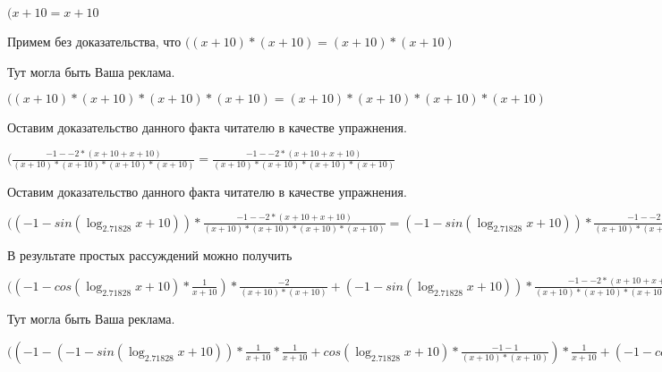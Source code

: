 \documentclass[12pt,a4paper,fleqn]{article}
\theoremstyle{definition}
\begin{document}
$( x  +  10  =  x  +  10 $

Примем без доказательства, что
$(( x  +  10 ) * ( x  +  10 ) = ( x  +  10 ) * ( x  +  10 )$

Тут могла быть Ваша реклама.

$(( x  +  10 ) * ( x  +  10 ) * ( x  +  10 ) * ( x  +  10 ) = ( x  +  10 ) * ( x  +  10 ) * ( x  +  10 ) * ( x  +  10 )$

Оставим доказательство данного факта читателю в качестве упражнения.

$(\frac{ -1  -  -2  * ( x  +  10  +  x  +  10 )}{( x  +  10 ) * ( x  +  10 ) * ( x  +  10 ) * ( x  +  10 )}
 = \frac{ -1  -  -2  * ( x  +  10  +  x  +  10 )}{( x  +  10 ) * ( x  +  10 ) * ( x  +  10 ) * ( x  +  10 )}
$

Оставим доказательство данного факта читателю в качестве упражнения.

$(( -1  - sin(\log_{ 2.71828 }{ x  +  10 })) * \frac{ -1  -  -2  * ( x  +  10  +  x  +  10 )}{( x  +  10 ) * ( x  +  10 ) * ( x  +  10 ) * ( x  +  10 )}
 = ( -1  - sin(\log_{ 2.71828 }{ x  +  10 })) * \frac{ -1  -  -2  * ( x  +  10  +  x  +  10 )}{( x  +  10 ) * ( x  +  10 ) * ( x  +  10 ) * ( x  +  10 )}
$

В результате простых рассуждений можно получить

$(( -1  - cos(\log_{ 2.71828 }{ x  +  10 }) * \frac{ 1 }{ x  +  10 }
) * \frac{ -2 }{( x  +  10 ) * ( x  +  10 )}
 + ( -1  - sin(\log_{ 2.71828 }{ x  +  10 })) * \frac{ -1  -  -2  * ( x  +  10  +  x  +  10 )}{( x  +  10 ) * ( x  +  10 ) * ( x  +  10 ) * ( x  +  10 )}
 = ( -1  - cos(\log_{ 2.71828 }{ x  +  10 }) * \frac{ 1 }{ x  +  10 }
) * \frac{ -2 }{( x  +  10 ) * ( x  +  10 )}
 + ( -1  - sin(\log_{ 2.71828 }{ x  +  10 })) * \frac{ -1  -  -2  * ( x  +  10  +  x  +  10 )}{( x  +  10 ) * ( x  +  10 ) * ( x  +  10 ) * ( x  +  10 )}
$

Тут могла быть Ваша реклама.

$(( -1  - ( -1  - sin(\log_{ 2.71828 }{ x  +  10 })) * \frac{ 1 }{ x  +  10 }
 * \frac{ 1 }{ x  +  10 }
 + cos(\log_{ 2.71828 }{ x  +  10 }) * \frac{ -1  -  1 }{( x  +  10 ) * ( x  +  10 )}
) * \frac{ 1 }{ x  +  10 }
 + ( -1  - cos(\log_{ 2.71828 }{ x  +  10 }) * \frac{ 1 }{ x  +  10 }
) * \frac{ -1  -  1 }{( x  +  10 ) * ( x  +  10 )}
 + ( -1  - cos(\log_{ 2.71828 }{ x  +  10 }) * \frac{ 1 }{ x  +  10 }
) * \frac{ -2 }{( x  +  10 ) * ( x  +  10 )}
 + ( -1  - sin(\log_{ 2.71828 }{ x  +  10 })) * \frac{ -1  -  -2  * ( x  +  10  +  x  +  10 )}{( x  +  10 ) * ( x  +  10 ) * ( x  +  10 ) * ( x  +  10 )}
 = ( -1  - ( -1  - sin(\log_{ 2.71828 }{ x  +  10 })) * \frac{ 1 }{ x  +  10 }
 * \frac{ 1 }{ x  +  10 }
 + cos(\log_{ 2.71828 }{ x  +  10 }) * \frac{ -1  -  1 }{( x  +  10 ) * ( x  +  10 )}
) * \frac{ 1 }{ x  +  10 }
 + ( -1  - cos(\log_{ 2.71828 }{ x  +  10 }) * \frac{ 1 }{ x  +  10 }
) * \frac{ -1  -  1 }{( x  +  10 ) * ( x  +  10 )}
 + ( -1  - cos(\log_{ 2.71828 }{ x  +  10 }) * \frac{ 1 }{ x  +  10 }
) * \frac{ -2 }{( x  +  10 ) * ( x  +  10 )}
 + ( -1  - sin(\log_{ 2.71828 }{ x  +  10 })) * \frac{ -1  -  -2  * ( x  +  10  +  x  +  10 )}{( x  +  10 ) * ( x  +  10 ) * ( x  +  10 ) * ( x  +  10 )}
$
\end{document}
